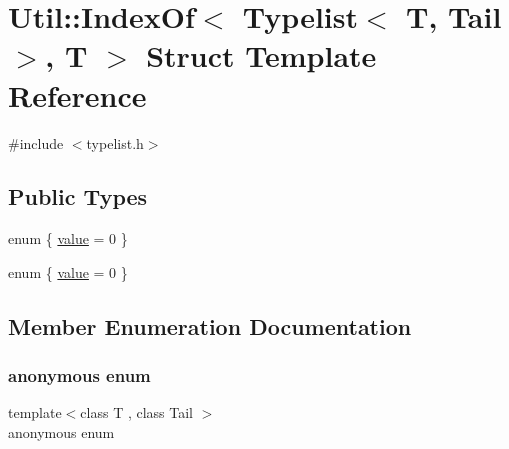 \hypertarget{structUtil_1_1TL_1_1IndexOf_3_01Typelist_3_01T_00_01Tail_01_4_00_01T_01_4}{}\section{Util\+:\+:Index\+Of$<$ Typelist$<$ T, Tail $>$, T $>$ Struct Template Reference}
\label{structUtil_1_1TL_1_1IndexOf_3_01Typelist_3_01T_00_01Tail_01_4_00_01T_01_4}


{\ttfamily \#include $<$typelist.\+h$>$}

\subsection*{Public Types}
\begin{DoxyCompactItemize}
\item 
enum \{ \mbox{\hyperlink{structUtil_1_1TL_1_1IndexOf_3_01Typelist_3_01T_00_01Tail_01_4_00_01T_01_4_a57b65f1f8efdf03f199359cba2183333a22f5ae7c317cc5ff18969cdbc7d3477f}{value}} = 0
 \}
\item 
enum \{ \mbox{\hyperlink{structUtil_1_1TL_1_1IndexOf_3_01Typelist_3_01T_00_01Tail_01_4_00_01T_01_4_a57b65f1f8efdf03f199359cba2183333a22f5ae7c317cc5ff18969cdbc7d3477f}{value}} = 0
 \}
\end{DoxyCompactItemize}


\subsection{Member Enumeration Documentation}
\mbox{\label{structUtil_1_1TL_1_1IndexOf_3_01Typelist_3_01T_00_01Tail_01_4_00_01T_01_4_a20109fc3938d086bab717994613be888}} 
\subsubsection{\texorpdfstring{anonymous enum}{anonymous enum}}
{\footnotesize\ttfamily template$<$class T , class Tail $>$ \\
anonymous enum}

